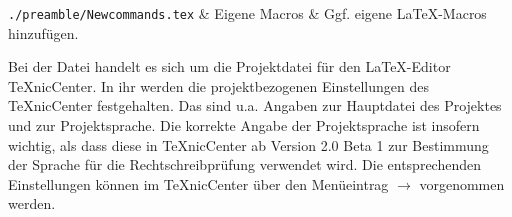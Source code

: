 \begin{table}[htbp]
\begin{tabularx}{\columnwidth}
\texttt{./preamble/Newcommands.tex}       & Eigene Macros
                                          & Ggf. eigene \LaTeX{}-Macros hinzufügen.\\
\bottomrule%
\end{tabularx}%
\caption[Dateien und Verzeichnisse der Vorlage]{Dateien und Verzeichnisse der Vorlage}%
\label{tab:StrukturDerVorlage}%
\end{table}

Bei der Datei  handelt es sich um die Projektdatei für den \LaTeX-Editor TeXnicCenter.
In ihr werden die projektbezogenen Einstellungen des TeXnicCenter festgehalten.
Das sind u.a. Angaben zur Hauptdatei des Projektes und zur Projektsprache.
Die korrekte Angabe der Projektsprache ist insofern wichtig, als dass diese in TeXnicCenter ab Version 2.0 Beta 1 zur Bestimmung der Sprache für die Rechtschreibprüfung verwendet wird.
Die entsprechenden Einstellungen können im TeXnicCenter über den Menüeintrag  $\rightarrow$  vorgenommen werden.


